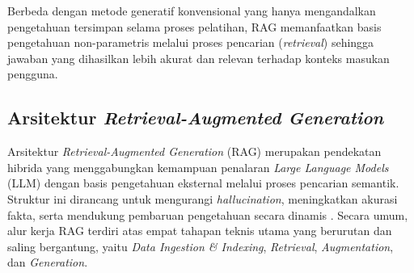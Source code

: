 Berbeda dengan metode generatif konvensional yang hanya mengandalkan pengetahuan tersimpan selama proses pelatihan, RAG memanfaatkan basis pengetahuan non-parametris melalui proses pencarian (\textit{retrieval}) sehingga jawaban yang dihasilkan lebih akurat dan relevan terhadap konteks masukan pengguna.

\subsection{Arsitektur \textit{Retrieval-Augmented Generation}}

Arsitektur \textit{Retrieval-Augmented Generation} (RAG) merupakan pendekatan hibrida yang menggabungkan kemampuan penalaran \textit{Large Language Models} (LLM) dengan basis pengetahuan eksternal melalui proses pencarian semantik. Struktur ini dirancang untuk mengurangi \textit{hallucination}, meningkatkan akurasi fakta, serta mendukung pembaruan pengetahuan secara dinamis \parencite{rag_survey}. Secara umum, alur kerja RAG terdiri atas empat tahapan teknis utama yang berurutan dan saling bergantung, yaitu \textit{Data Ingestion \& Indexing}, \textit{Retrieval}, \textit{Augmentation}, dan \textit{Generation}.


